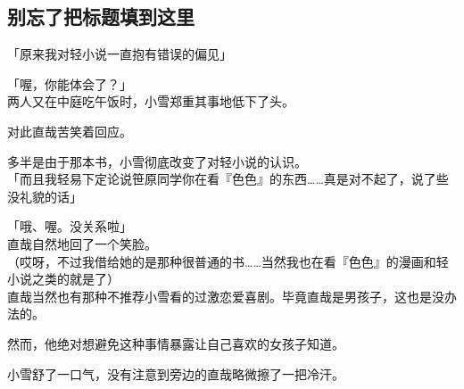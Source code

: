 \subsection{别忘了把标题填到这里}

「原来我对轻小说一直抱有错误的偏见」

「喔，你能体会了？」\\

两人又在中庭吃午饭时，小雪郑重其事地低下了头。

对此直哉苦笑着回应。

多半是由于那本书，小雪彻底改变了对轻小说的认识。\\

「而且我轻易下定论说笹原同学你在看『色色』的东西……真是对不起了，说了些没礼貌的话」

「哦、喔。没关系啦」\\

直哉自然地回了一个笑脸。\\

（哎呀，不过我借给她的是那种很普通的书……当然我也在看『色色』的漫画和轻小说之类的就是了）\\

直哉当然也有那种不推荐小雪看的过激恋爱喜剧。毕竟直哉是男孩子，这也是没办法的。

然而，他绝对想避免这种事情暴露让自己喜欢的女孩子知道。

小雪舒了一口气，没有注意到旁边的直哉略微擦了一把冷汗。\\

